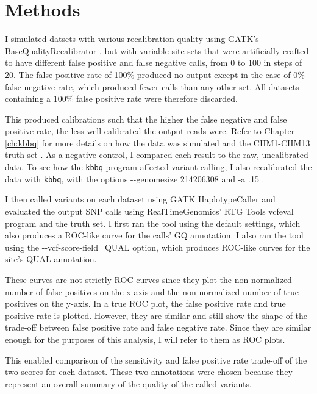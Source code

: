\documentclass{report}
\begin{document}
\section{Methods}
\begin{outline}
\item I simulated datsets with various recalibration quality using GATK's BaseQualityRecalibrator \parencite{auwera_fastq_2013}, but with variable site sets that were artificially crafted to have different false positive and false negative calls, from 0 to 100 in steps of 20. The false positive rate of 100\% produced no output except in the case of 0\% false negative rate, which produced fewer calls than any other set. All datasets containing a 100\% false positive rate were therefore discarded.
\item This produced calibrations such that the higher the false negative and false positive rate, the less well-calibrated the output reads were. Refer to Chapter \ref{ch:kbbq} for more details on how the data was simulated and the CHM1-CHM13 truth set \parencite{li_synthetic-diploid_2018}. As a negative control, I compared each result to the raw, uncalibrated data. To see how the \texttt{kbbq} program affected variant calling, I also recalibrated the data with \texttt{kbbq}, with the options -\phantom{}-genomesize 214206308 and -a .15 .
\item I then called variants on each dataset using GATK HaplotypeCaller \parencite{poplin_scaling_2018} and evaluated the output SNP calls using RealTimeGenomics' RTG Tools vcfeval program \parencite{cleary_comparing_2015} and the truth set. I first ran the tool using the default settings, which also produces a ROC-like curve for the calls' GQ annotation. I also ran the tool using the -\phantom{}-vcf-score-field=QUAL option, which produces ROC-like curves for the site's QUAL annotation.
\item These curves are not strictly ROC curves since they plot the non-normalized number of false positives on the x-axis and the non-normalized number of true positives on the y-axis. In a true ROC plot, the false positive rate and true positive rate is plotted. However, they are similar and still show the shape of the trade-off between false positive rate and false negative rate. Since they are similar enough for the purposes of this analysis, I will refer to them as ROC plots.
\item This enabled comparison of the sensitivity and false positive rate trade-off of the two scores for each dataset. These two annotations were chosen because they represent an overall summary of the quality of the called variants.


\end{outline}
\end{document}
